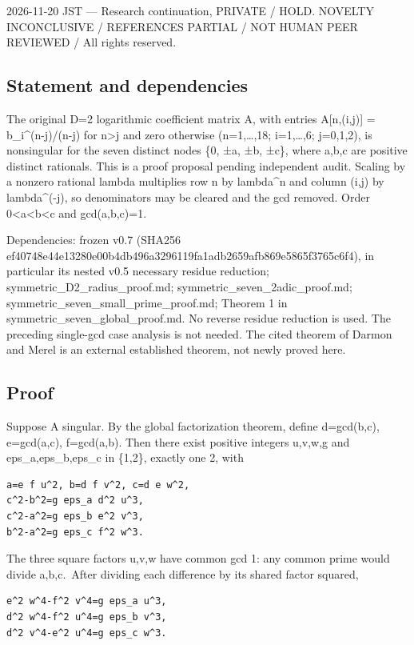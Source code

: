 \documentclass[
  10pt,
]{article}
\begin{document}
2026-11-20 JST --- Research continuation, PRIVATE / HOLD. NOVELTY
INCONCLUSIVE / REFERENCES PARTIAL / NOT HUMAN PEER REVIEWED / All rights
reserved.

\subsection{Statement and
dependencies}\label{statement-and-dependencies}

The original D=2 logarithmic coefficient matrix A, with entries
A{[}n,(i,j){]} = b\_i\^{}(n-j)/(n-j) for n\textgreater j and zero
otherwise (n=1,\ldots,18; i=1,\ldots,6; j=0,1,2), is nonsingular for the
seven distinct nodes \{0, ±a, ±b, ±c\}, where a,b,c are positive
distinct rationals. This is a proof proposal pending independent audit.
Scaling by a nonzero rational lambda multiplies row n by lambda\^{}n and
column (i,j) by lambda\^{}(-j), so denominators may be cleared and the
gcd removed. Order 0\textless a\textless b\textless c and gcd(a,b,c)=1.

Dependencies: frozen v0.7 (SHA256
ef40748e44e13280e00b4db496a3296119fa1adb2659afb869e5865f3765c6f4), in
particular its nested v0.5 necessary residue reduction;
symmetric\_D2\_radius\_proof.md; symmetric\_seven\_2adic\_proof.md;
symmetric\_seven\_small\_prime\_proof.md; Theorem 1 in
symmetric\_seven\_global\_proof.md. No reverse residue reduction is
used. The preceding single-gcd case analysis is not needed. The cited
theorem of Darmon and Merel is an external established theorem, not
newly proved here.

\subsection{Proof}\label{proof}

Suppose A singular. By the global factorization theorem, define
d=gcd(b,c), e=gcd(a,c), f=gcd(a,b). Then there exist positive integers
u,v,w,g and eps\_a,eps\_b,eps\_c in \{1,2\}, exactly one 2, with

\begin{verbatim}
a=e f u^2, b=d f v^2, c=d e w^2,
c^2-b^2=g eps_a d^2 u^3,
c^2-a^2=g eps_b e^2 v^3,
b^2-a^2=g eps_c f^2 w^3.
\end{verbatim}

The three square factors u,v,w have common gcd 1: any common prime would
divide a,b,c.~After dividing each difference by its shared factor
squared,

\begin{verbatim}
e^2 w^4-f^2 v^4=g eps_a u^3,
d^2 w^4-f^2 u^4=g eps_b v^3,
d^2 v^4-e^2 u^4=g eps_c w^3.
\end{verbatim}
\end{document}

